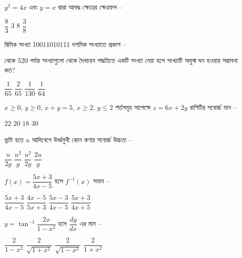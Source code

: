 \documentclass[addpoints]{exam}
\begin{document}
\begin{questions}
\question  $ y^{2}=4x $ এবং $ y=x $ দ্বারা আবদ্ধ ক্ষেত্রের ক্ষেত্রফল – 

\begin{oneparchoices}
\choice $ \dfrac{8}{3} $
\choice $ 3 $
\choice $ 8 $
\choice $ \dfrac{3}{8} $
\end{oneparchoices}

\question দ্বিমিক সংখ্যা 10011010111 দশমিক সংখ্যাতে  প্রকাশ  –

\begin{oneparchoices}
\end{oneparchoices}

 থেকে 520 পর্যন্ত সংখ্যাগুলো থেকে দৈবচয়ন পদ্ধতিতে একটি সংখ্যা নেয়া হলে সংখ্যাটি অযুগ্ম ঘন হওয়ার সম্ভাবনা কত?

\begin{oneparchoices}
\choice $ \dfrac{1}{65} $
\choice $ \dfrac{2}{65} $
\choice $ \dfrac{1}{130} $
\choice $ \dfrac{1}{64} $

\end{oneparchoices}

\question  $ x\ge 0,\, y\ge 0,\, x+y = 5,\, x\ge 2,\, y\le 2 $ শর্তসমূহ সাপেক্ষে $ z=6x+2y $ রাশিটির সবোর্চ্চ মান – 

\begin{oneparchoices}
\choice $ 22 $
\choice  $ 20 $
\choice $ 18 $
\choice $ 30 $
\end{oneparchoices}


\question ভুমি হতে $ u $ আদিবেগে উর্ধ্বমুখী কোন কণার সবোর্চ্চ উচ্চতা – 

\begin{oneparchoices}
\choice  $ \dfrac{u}{2g} $
\choice  $ \dfrac{u^{2}}{g} $
\choice  $ \dfrac{u^{2}}{2g} $
\choice  $ \dfrac{2u}{g} $
\end{oneparchoices}

\question  $ f(x) = \dfrac{5x+3}{4x-5} $ হলে $  f^{-1}(x) $ সমান –

\begin{oneparchoices}
\choice $ \dfrac{5x+3}{4x-5}$
\choice $ \dfrac{4x-5}{5x+3}$
\choice $ \dfrac{5x-3}{4x-5}$
\choice  $ \dfrac{5x+3}{4x+5}$
\end{oneparchoices}

\question $ y= \tan^{-1}\dfrac{2x}{1-x^{2}} $ হলে $ \dfrac{dy}{dx} $ এর মান – 

\begin{oneparchoices}
\choice $ \dfrac{2}{1-x^{2}} $
\choice $ \dfrac{2}{\sqrt{1+x^{2}}} $
\choice $ \dfrac{2}{\sqrt{1-x^{2}}} $
\choice  $ \dfrac{2}{1+x^{2}} $
\end{oneparchoices}


\end{questions}
\end{document}
